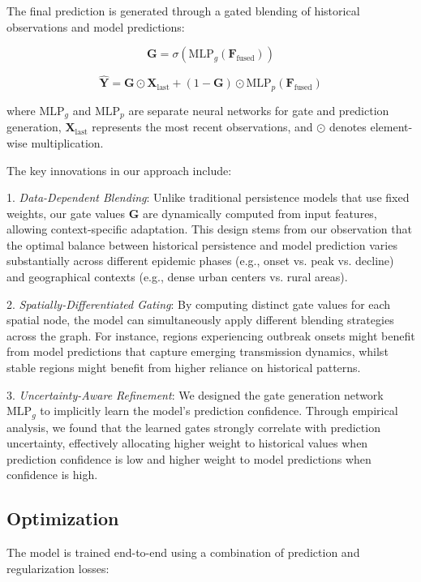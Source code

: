 \documentclass[lettersize, journal]{IEEEtran}
\begin{document}
The final prediction is generated through a gated blending of historical observations and model predictions:

\begin{equation}
\mathbf{G} = \sigma(\text{MLP}_g(\mathbf{F}_{\text{fused}}))
\end{equation}

\begin{equation}
\hat{\mathbf{Y}} = \mathbf{G} \odot \mathbf{X}_{\text{last}} + (1 - \mathbf{G}) \odot \text{MLP}_p(\mathbf{F}_{\text{fused}})
\end{equation}

where $\text{MLP}_g$ and $\text{MLP}_p$ are separate neural networks for gate and prediction generation, $\mathbf{X}_{\text{last}}$ represents the most recent observations, and $\odot$ denotes element-wise multiplication. 

The key innovations in our approach include:

1. \textit{Data-Dependent Blending}: Unlike traditional persistence models that use fixed weights, our gate values $\mathbf{G}$ are dynamically computed from input features, allowing context-specific adaptation. This design stems from our observation that the optimal balance between historical persistence and model prediction varies substantially across different epidemic phases (e.g., onset vs. peak vs. decline) and geographical contexts (e.g., dense urban centers vs. rural areas).

2. \textit{Spatially-Differentiated Gating}: By computing distinct gate values for each spatial node, the model can simultaneously apply different blending strategies across the graph. For instance, regions experiencing outbreak onsets might benefit from model predictions that capture emerging transmission dynamics, whilst stable regions might benefit from higher reliance on historical patterns.

3. \textit{Uncertainty-Aware Refinement}: We designed the gate generation network $\text{MLP}_g$ to implicitly learn the model's prediction confidence. Through empirical analysis, we found that the learned gates strongly correlate with prediction uncertainty, effectively allocating higher weight to historical values when prediction confidence is low and higher weight to model predictions when confidence is high.

\subsection{Optimization}
The model is trained end-to-end using a combination of prediction and regularization losses:
\end{document}
